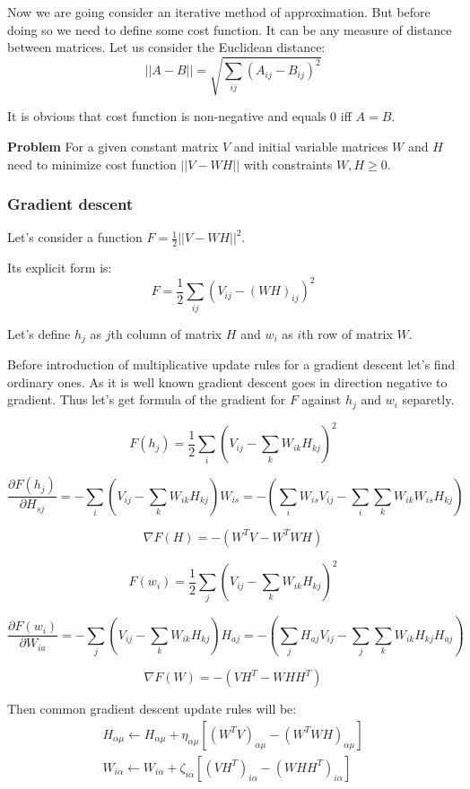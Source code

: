 \documentclass[oneside, final, 14pt]{extarticle}
\begin{document}
Now we are going consider an iterative method of approximation.
But before doing so we need to define some cost function.
It can be any measure of distance between matrices.
Let us consider the Euclidean distance:
\[
  ||A - B|| = \sqrt{\sum_{ij} (A_{ij} - B_{ij})^2}
\]

It is obvious that cost function is non-negative
and equals 0 iff $A = B$.

\textbf{Problem} For a given constant matrix $V$
and initial variable matrices $W$ and $H$
need to minimize cost function $||V - WH||$ with constraints
$W,H \geqslant 0$.

\subsubsection{Gradient descent}
Let's consider a function $F = \frac{1}{2}||V - WH||^2$.

Its explicit form is:
\[
  F = \frac{1}{2} \sum_{ij}
  \left(
    V_{ij} - (WH)_{ij}
  \right)^2
\]

Let's define $h_j$ as $j$th column of matrix $H$
and $w_i$ as $i$th row of matrix $W$.

Before introduction of multiplicative update rules
for a gradient descent let's find ordinary ones.
As it is well known gradient descent goes in direction
negative to gradient. Thus let's get formula of the gradient
for $F$ against $h_j$ and $w_i$ separetly.

\[
  F(h_j) = \frac{1}{2} \sum_{i}
  \left(
    V_{ij} - \sum_{k}W_{ik}H_{kj}
  \right)^2
\]

\[
  \frac{\partial F(h_j)}{\partial H_{sj}} =
  - \sum_i
    \left(
      V_{ij} - \sum_k W_{ik}H_{kj}
    \right)
  W_{is} =
  -
    \left(
      \sum_i W_{is}V_{ij} - \sum_i\sum_kW_{ik}W_{is}H_{kj}
    \right)
\]

\[
  \nabla F(H) = - ( W^TV - W^TWH )
\]

\[
  F(w_i) = \frac{1}{2}\sum_j
    \left( V_{ij} - \sum_k W_{ik}H_{kj} \right)^2
\]

\[
  \frac{\partial F(w_i)}{\partial W_{ia}} =
  - \sum_j
    \left(
      V_{ij} - \sum_k W_{ik}H_{kj}
    \right)
  H_{aj} =
  -
    \left(
      \sum_j H_{aj}V_{ij} - \sum_j \sum_k W_{ik}H_{kj}H_{aj}
    \right)
\]

\[
  \nabla F(W) = - ( VH^T - WHH^T )
\]

Then common gradient descent update rules will be:
\begin{align*}
  H_{\alpha\mu} \leftarrow H_{\alpha\mu} +
  \eta_{\alpha\mu} \left[
     (W^TV)_{\alpha\mu} - (W^TWH)_{\alpha\mu}
  \right] \\
  W_{i\alpha} \leftarrow W_{i\alpha} +
  \zeta_{i\alpha} \left[
    (VH^T)_{i\alpha} - (WHH^T)_{i\alpha}
  \right]
\end{align*}
\end{document}
